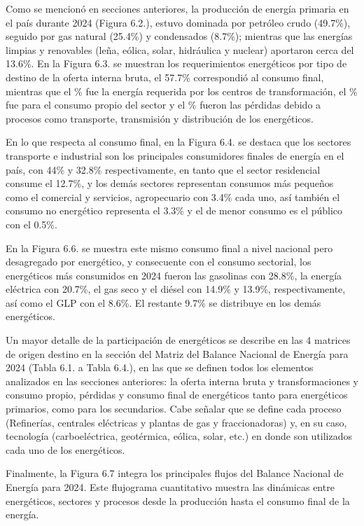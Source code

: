 \documentclass{sener2025}
\begin{document}
Como se mencionó en secciones anteriores, la producción de energía primaria en el país durante 2024 (Figura 6.2.), estuvo dominada por petróleo crudo (49.7\%), seguido por gas natural (25.4\%) y condensados (8.7\%); mientras que las energías limpias y renovables (leña, eólica, solar, hidráulica y nuclear) aportaron cerca del 13.6\%.
En la Figura 6.3. se muestran los requerimientos energéticos por tipo de destino de la oferta interna bruta, el 57.7\% correspondió al consumo final, mientras que el \% fue la energía requerida por los centros de transformación, el \% fue para el consumo propio del sector y el \% fueron las pérdidas debido a procesos como transporte, transmisión y distribución de los energéticos.

En lo que respecta al consumo final, en la Figura 6.4. se destaca que los sectores transporte e industrial son los principales consumidores finales de energía en el país, con 44\% y 32.8\% respectivamente, en tanto que el sector residencial consume el 12.7\%, y los demás sectores representan consumos más pequeños como el comercial y servicios, agropecuario con 3.4\% cada uno, así también el consumo no energético representa el 3.3\% y el de menor consumo es el público con el 0.5\%.

En la Figura 6.6. se muestra este mismo consumo final a nivel nacional pero desagregado por energético, y consecuente con el consumo sectorial, los energéticos más consumidos en 2024 fueron las gasolinas con 28.8\%, la energía eléctrica con 20.7\%, el gas seco y el diésel con 14.9\% y 13.9\%, respectivamente, así como el GLP con el 8.6\%. El restante 9.7\% se distribuye en los demás energéticos.

Un mayor detalle de la participación de energéticos se describe en las 4 matrices de origen destino en la sección del Matriz del Balance Nacional de Energía para 2024 (Tabla 6.1. a Tabla 6.4.), en las que se definen todos los elementos analizados en las secciones anteriores: la oferta interna bruta y transformaciones y consumo propio, pérdidas y consumo final de energéticos tanto para energéticos primarios, como para los secundarios. Cabe señalar que se define cada proceso (Refinerías, centrales eléctricas y plantas de gas y fraccionadoras) y, en su caso, tecnología (carboeléctrica, geotérmica, eólica, solar, etc.) en donde son utilizados cada uno de los energéticos.

Finalmente, la Figura 6.7 integra los principales flujos del Balance Nacional de Energía para 2024. Este flujograma cuantitativo muestra las dinámicas entre energéticos, sectores y procesos desde la producción hasta el consumo final de la energía.
\end{document}
